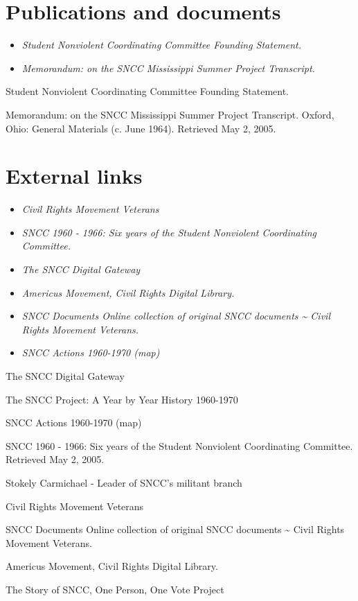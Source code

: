 \section{Publications and documents}\label{publications-and-documents}

\begin{itemize}
\item
  \emph{Student Nonviolent Coordinating Committee Founding Statement.}
\item
  \emph{Memorandum: on the SNCC Mississippi Summer Project Transcript.}
\end{itemize}

Student Nonviolent Coordinating Committee Founding Statement.

Memorandum: on the SNCC Mississippi Summer Project Transcript. Oxford,
Ohio: General Materials (c. June 1964). Retrieved May 2, 2005.

\section{External links}\label{external-links}

\begin{itemize}
\item
  \emph{Civil Rights Movement Veterans}
\item
  \emph{SNCC 1960 - 1966: Six years of the Student Nonviolent
  Coordinating Committee.}
\item
  \emph{The SNCC Digital Gateway}
\item
  \emph{Americus Movement, Civil Rights Digital Library.}
\item
  \emph{SNCC Documents Online collection of original SNCC documents
  \textasciitilde{} Civil Rights Movement Veterans.}
\item
  \emph{SNCC Actions 1960-1970 (map)}
\end{itemize}

The SNCC Digital Gateway

The SNCC Project: A Year by Year History 1960-1970

SNCC Actions 1960-1970 (map)

SNCC 1960 - 1966: Six years of the Student Nonviolent Coordinating
Committee. Retrieved May 2, 2005.

Stokely Carmichael - Leader of SNCC's militant branch

Civil Rights Movement Veterans

SNCC Documents Online collection of original SNCC documents
\textasciitilde{} Civil Rights Movement Veterans.

Americus Movement, Civil Rights Digital Library.

The Story of SNCC, One Person, One Vote Project
